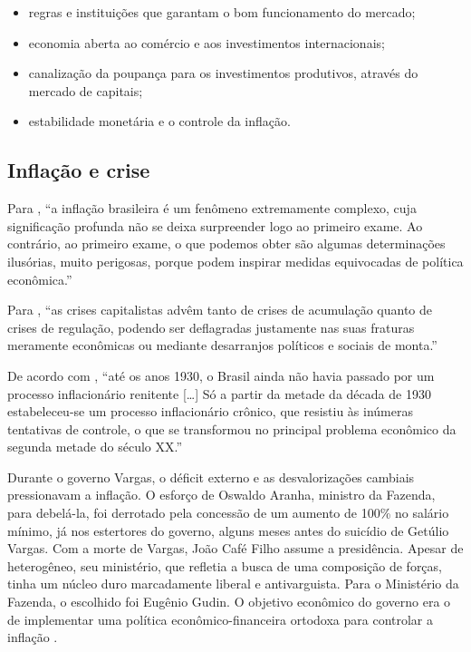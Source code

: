 \documentclass[
	10pt,				%
	openright,			%
	twoside,			%
	a5paper,			%
	english,			%
	french,				%
	spanish,			%
	brazil				%
	]{abntex2}
\renewenvironment{quote}
  {\small\list{}{\rightmargin=0.1cm \leftmargin=4cm}%
   \item\relax}
  {\endlist}
\begin{document}
\begin{itemize}
\tightlist
\item
  regras e instituições que garantam o bom funcionamento do mercado;
\item
  economia aberta ao comércio e aos investimentos internacionais;
\item
  canalização da poupança para os investimentos produtivos, através do
  mercado de capitais;
\item
  estabilidade monetária e o controle da inflação.
\end{itemize}

\subsection{Inflação e crise}\label{inflauxe7uxe3o-e-crise}

Para , ``a inflação brasileira é um
fenômeno extremamente complexo, cuja significação profunda não se deixa
surpreender logo ao primeiro exame. Ao contrário, ao primeiro exame, o
que podemos obter são algumas determinações ilusórias, muito perigosas,
porque podem inspirar medidas equivocadas de política econômica.''

Para , ``as crises capitalistas advêm tanto
de crises de acumulação quanto de crises de regulação, podendo ser
deflagradas justamente nas suas fraturas meramente econômicas ou
mediante desarranjos políticos e sociais de monta.''

De acordo com , ``até os anos 1930, o
Brasil ainda não havia passado por um processo inflacionário renitente
{[}\ldots{}{]} Só a partir da metade da década de 1930 estabeleceu-se um
processo inflacionário crônico, que resistiu às inúmeras tentativas de
controle, o que se transformou no principal problema econômico da
segunda metade do século XX.''

\begin{quote}
Durante o governo Vargas, o déficit externo e as desvalorizações
cambiais pressionavam a inflação. O esforço de Oswaldo Aranha, ministro
da Fazenda, para debelá-la, foi derrotado pela concessão de um aumento
de 100\% no salário mínimo, já nos estertores do governo, alguns meses
antes do suicídio de Getúlio Vargas. Com a morte de Vargas, João Café
Filho assume a presidência. Apesar de heterogêneo, seu ministério, que
refletia a busca de uma composição de forças, tinha um núcleo duro
marcadamente liberal e antivarguista. Para o Ministério da Fazenda, o
escolhido foi Eugênio Gudin. O objetivo econômico do governo era o de
implementar uma política econômico-financeira ortodoxa para controlar a
inflação \cite[p.~41]{resende2017}.
\end{quote}
\end{document}
